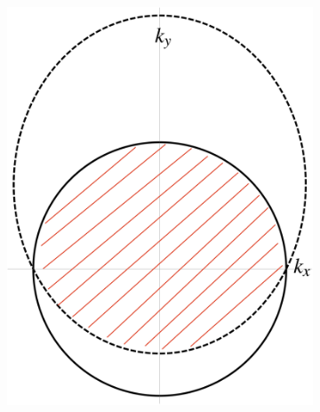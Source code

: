     \begin{figure}[H] 
        \centering
            \begin{subfigure}[b]{0.3\linewidth}
                \includegraphics[width=\linewidth]{fig/Fermi surface.png}
                \caption{}
                \label{fig:fermi surface}
            \end{subfigure}
            \begin{subfigure}[b]{0.3\linewidth}

\end{subfigure}
\end{figure}
